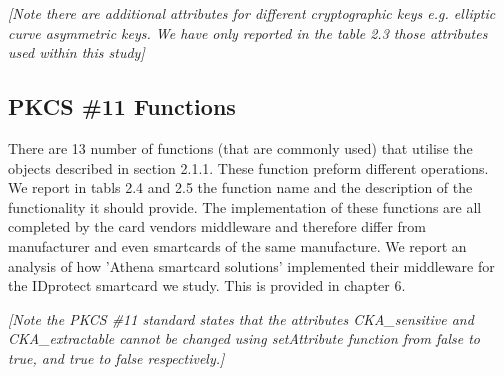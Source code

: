 \documentclass[bsc,frontabs,twoside,singlespacing,parskip,deptreport]{infthesis}     %
\begin{document}
\textit{[Note there are additional attributes for different cryptographic keys e.g. elliptic curve asymmetric keys. We have only reported in the table 2.3 those attributes used within this study]}

\subsection{PKCS \#11 Functions}

There are 13 number of functions (that are commonly used) that utilise the objects described in section 2.1.1. These function preform different operations. We report in tabls 2.4 and 2.5 the function name and the description of the functionality it should provide. The implementation of these functions are all completed by the card vendors middleware and therefore differ from manufacturer and even smartcards of the same manufacture. We report an analysis of how 'Athena smartcard solutions' implemented their middleware for the IDprotect smartcard we study. This is provided in chapter 6.

\textit{[Note the PKCS \#11 standard states that the attributes CKA\_sensitive and CKA\_extractable cannot be changed using setAttribute function from false to true, and true to false respectively.]}
\end{document}
